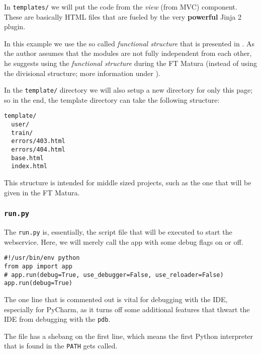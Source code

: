 \documentclass[../main/main.tex]{subfiles}
\begin{document}
In \lstinline|templates/| we will put the code from the \textit{view}
(from MVC) component. These are basically HTML files that are fueled
by the very \textbf{powerful} Jinja 2 plugin.

In this example we use the so called \textit{functional structure} that is
presented in \cite{exploreflask:functional}. As the author assumes that the
modules are not fully independent from each other, he suggests using the
\textit{functional structure} during the FT Matura (instead of using the
divisional structure; more information under \cite{exploreflask:functional}). 


In the \lstinline|template/| directory we will also setup a new directory for
only this page; so in the end, the template directory can take the following
structure: 

\begin{lstlisting}
template/
  user/
  train/
  errors/403.html
  errors/404.html
  base.html
  index.html
\end{lstlisting}

This structure is intended for middle sized projects, such as the one that will
be given in the FT Matura. 

\subsubsection{\lstinline|run.py|}

The \lstinline|run.py| is, essentially, the script file that will be executed to
start the webservice. Here, we will merely call the app with some debug flags
on or off. 

\begin{lstlisting}[caption=run.py, label=lst:run.py]
#!/usr/bin/env python
from app import app
# app.run(debug=True, use_debugger=False, use_reloader=False)
app.run(debug=True)
\end{lstlisting}

The one line that is commented out is vital for debugging with the
IDE, especially for PyCharm, as it turns off some additional features
that thwart the IDE from debugging with the \lstinline|pdb|. 

The file has a shebang on the first line, which means the first Python
interpreter that is found in the \lstinline|PATH| gets called. 
\end{document}
